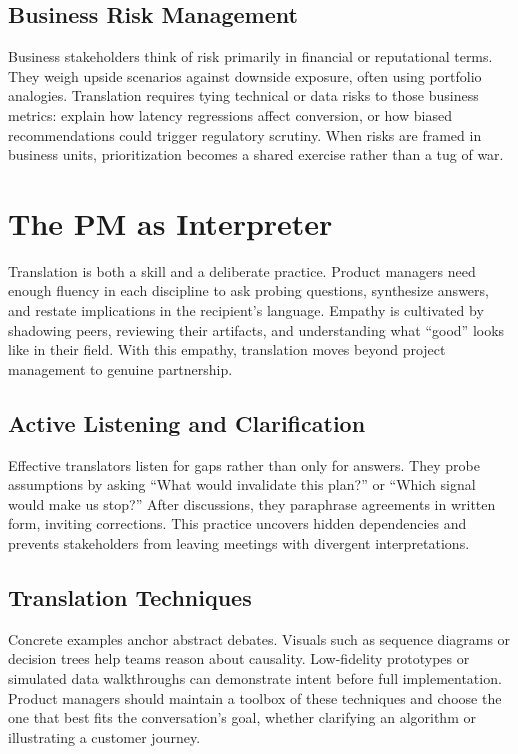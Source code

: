 \subsection{Business Risk Management}
Business stakeholders think of risk primarily in financial or reputational terms. They weigh upside scenarios against downside exposure, often using portfolio analogies. Translation requires tying technical or data risks to those business metrics: explain how latency regressions affect conversion, or how biased recommendations could trigger regulatory scrutiny. When risks are framed in business units, prioritization becomes a shared exercise rather than a tug of war.

\section{The PM as Interpreter}
\label{sec:pm-interpreter}

Translation is both a skill and a deliberate practice. Product managers need enough fluency in each discipline to ask probing questions, synthesize answers, and restate implications in the recipient's language. Empathy is cultivated by shadowing peers, reviewing their artifacts, and understanding what ``good'' looks like in their field. With this empathy, translation moves beyond project management to genuine partnership.

\subsection{Active Listening and Clarification}
Effective translators listen for gaps rather than only for answers. They probe assumptions by asking ``What would invalidate this plan?'' or ``Which signal would make us stop?'' After discussions, they paraphrase agreements in written form, inviting corrections. This practice uncovers hidden dependencies and prevents stakeholders from leaving meetings with divergent interpretations.

\subsection{Translation Techniques}
Concrete examples anchor abstract debates. Visuals such as sequence diagrams or decision trees help teams reason about causality. Low-fidelity prototypes or simulated data walkthroughs can demonstrate intent before full implementation. Product managers should maintain a toolbox of these techniques and choose the one that best fits the conversation's goal, whether clarifying an algorithm or illustrating a customer journey.

